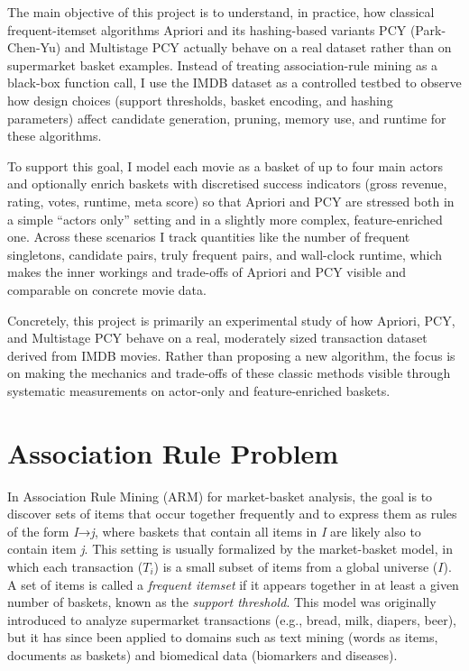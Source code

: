 \documentclass{article}  %
\begin{document}
The main objective of this project is to understand, in practice, how classical frequent-itemset algorithms Apriori and its hashing-based variants PCY (Park-Chen-Yu) and Multistage PCY actually behave on a real dataset rather than on supermarket basket examples. Instead of treating association-rule mining as a black-box function call, I use the IMDB dataset as a controlled testbed to observe how design choices (support thresholds, basket encoding, and hashing parameters) affect candidate generation, pruning, memory use, and runtime for these algorithms.

To support this goal, I model each movie as a basket of up to four main actors and optionally enrich baskets with discretised success indicators (gross revenue, rating, votes, runtime, meta score) so that Apriori and PCY are stressed both in a simple “actors only” setting and in a slightly more complex, feature-enriched one. Across these scenarios I track quantities like the number of frequent singletons, candidate pairs, truly frequent pairs, and wall-clock runtime, which makes the inner workings and trade-offs of Apriori and PCY visible and comparable on concrete movie data.

Concretely, this project is primarily an experimental study of how Apriori, PCY, and Multistage PCY behave on a real, moderately sized transaction dataset derived from IMDB movies. Rather than proposing a new algorithm, the focus is on making the mechanics and trade-offs of these classic methods visible through systematic measurements on actor-only and feature-enriched baskets. 


 
\section{Association Rule Problem}

In Association Rule Mining (ARM) for market-basket analysis, the goal is to discover sets of items that occur together frequently and to express them as rules of the form \textit{I}→\textit{j}, where baskets that contain all items in \textit{I} are likely also to contain item \textit{j}. This setting is usually formalized by the market-basket model, in which each transaction (\(T_i \)) is a small subset of items from a global universe (\(I\)). A set of items is called a \textit{frequent itemset} if it appears together in at least a given number of baskets, known as the \textit{support threshold}. This model was originally introduced to analyze supermarket transactions (e.g., bread, milk, diapers, beer), but it has since been applied to domains such as text mining (words as items, documents as baskets) and biomedical data (biomarkers and diseases).
\end{document}
